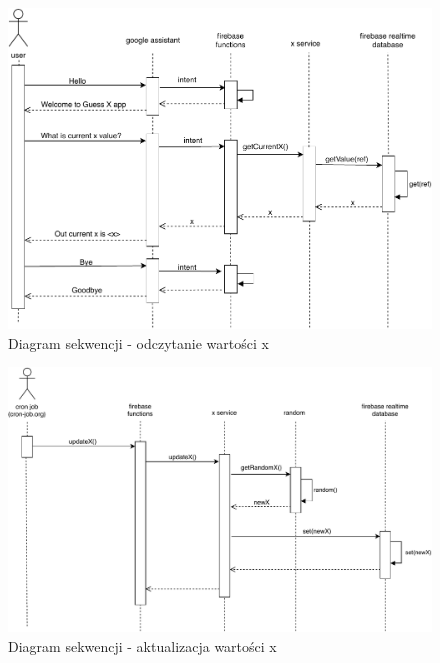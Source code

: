 \documentclass[a4paper,11pt]{article}
\begin{document}
        \begin{figure}[!h]
	    	\begin{center}
	    		\includegraphics[width=16cm]{guess-x-get-x.pdf}
	    	\end{center}
	    	\caption[Caption for LOF]{Diagram sekwencji - odczytanie wartości x}
	    	\label{getX}
	    \end{figure}
	    
    \begin{figure}[!h]
    	\begin{center}
    		\includegraphics[width=16cm]{guess-x-update-x.pdf}
    	\end{center}
    	\caption[Caption for LOF]{Diagram sekwencji - aktualizacja wartości x}
    	\label{update}
    \end{figure}
    
\end{document}

